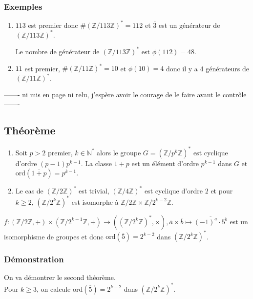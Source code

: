 \documentclass[a4paper,10pt]{book} %
\newcommand{\N}{\mathbb{N}}
\newcommand{\Z}{\mathbb{Z}}
\newcommand{\ord}{\mathrm{ord}}
\begin{document}
\subsubsection{Exemples}
\begin{enumerate}
\item $113$ est premier donc $\#(\Z/113\Z)^*=112$ et $\overline{3}$ est un générateur de $(\Z/113\Z)^*$.

Le nombre de générateur de $(\Z/113\Z)^*$ est $\phi(112)=48$.\\

\item $11$ est premier, $\#(\Z/11\Z)^*=10$ et $\phi(10)=4$ donc il y a 4 générateurs de $(\Z/11\Z)^*$.
\end{enumerate}

\newpage

\hfill ------- \hfill ni mis en page ni relu, j'espère avoir le courage de le faire avant le contrôle \hfill ------- \hfill

\subsection{Théorème}
\begin{enumerate}
\item Soit $p>2$ premier, $k\in \N^*$ alors le groupe $G=(\Z/p^k\Z)^*$ est cyclique d'ordre $(p-1)p^{k-1}$. La classe $1+p$ est un élément d'ordre $p^{k-1}$ dans $G$ et $\ord(\overline{1+p})=p^{k-1}$.
\item Le cas de $(\Z/2\Z)^*$ est trivial, $(\Z/4\Z)^*$ est cyclique d'ordre $2$ et pour $k\geq 2$, $(\Z/2^k\Z)^*$ est isomorphe à $\Z/2\Z \times \Z/2^{k-2}\Z$.
\end{enumerate}

$f:(\Z/2\Z,+)\times(\Z/2^{k-1}\Z,+) \rightarrow ((\Z/2^k\Z)^*,\times) , \overline{a} \times \overline{b} \mapsto \overline{(-1)^a\cdot 5^b}$ est un isomorphisme de groupes et donc $\ord(\overline{5})=2^{k-2}$ dans $(\Z/2^k\Z)^*$.

\subsubsection{Démonstration}
On va démontrer le second théorème.\\

Pour $k\geq 3$, on calcule $\ord(\overline{5})=2^{k-2}$ dans $(\Z/2^k\Z)^*$.
\end{document}
